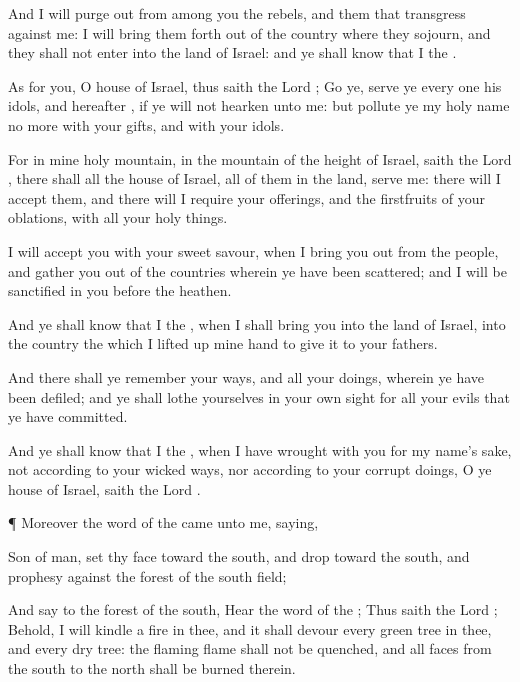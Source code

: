 {And I will purge
out from among you the
rebels, and them that
transgress against me: I will bring them
forth out of the
country where they
sojourn, and they shall not
enter into the
land of
Israel: and ye shall
know that I
{} the
{}.

As for you, O
house of
Israel, thus
saith the
Lord
{};
Go ye,
serve ye every
one his
idols, and
hereafter
{}, if ye will not
hearken unto me: but
pollute ye my
holy
name no more with your
gifts, and with your
idols.

For in mine
holy
mountain, in the
mountain of the
height of
Israel,
saith the
Lord
{}, there shall all the
house of
Israel, all of them in the
land,
serve me: there will I
accept them, and there will I
require your
offerings, and the
firstfruits of your
oblations, with all your holy
things.

I will
accept you with your
sweet
savour, when I bring you
out from the
people, and
gather you out of the
countries wherein ye have been
scattered; and I will be
sanctified in you
before the
heathen.

And ye shall
know that I
{} the
{}, when I shall
bring you into the
land of
Israel, into the
country
{} the which I lifted
up mine
hand to
give it to your
fathers.

And there shall ye
remember your
ways, and all your
doings, wherein ye have been
defiled; and ye shall
lothe yourselves in your own
sight for all your
evils that ye have
committed.

And ye shall
know that I
{} the
{}, when I have
wrought with you for my
name’s sake, not according to your
wicked
ways, nor according to your
corrupt
doings, O ye
house of
Israel,
saith the
Lord
{}.


\par }{\PP {}¶ Moreover the
word of the
{} came unto me,
saying,

Son of
man,
set thy
face
toward the
south, and
drop
{} toward the
south, and
prophesy against the
forest of the
south
field;

And
say to the
forest of the
south,
Hear the
word of the
{}; Thus
saith the
Lord
{}; Behold, I will
kindle a
fire in thee, and it shall
devour every
green
tree in thee, and every
dry
tree: the
flaming
flame shall not be
quenched, and all
faces from the
south to the
north shall be
burned therein.

}
